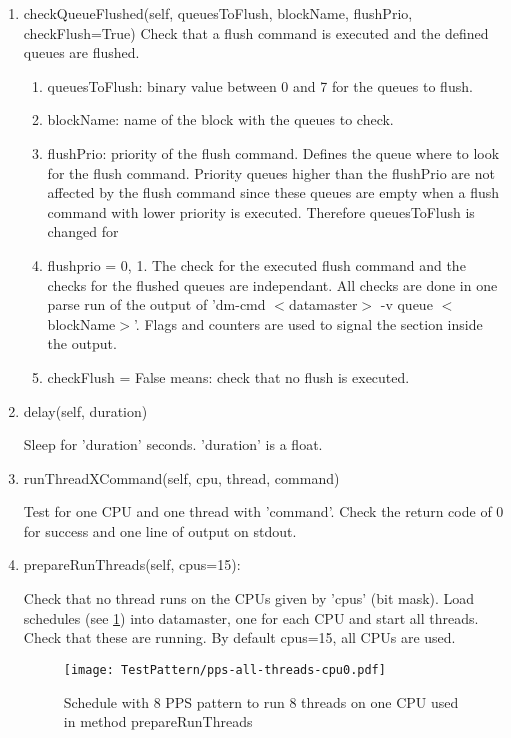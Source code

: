 \documentclass[12pt,a4paper]{report}
\begin{document}
\begin{enumerate}
\item checkQueueFlushed(self, queuesToFlush, blockName, flushPrio, checkFlush=True)
Check that a flush command is executed and the defined queues are flushed.
\begin{enumerate}
\item queuesToFlush: binary value between 0 and 7 for the queues to flush.
\item blockName: name of the block with the queues to check.
\item flushPrio: priority of the flush command. Defines the queue where to look for the flush command.
Priority queues higher than the flushPrio are not affected by the flush command since these
queues are empty when a flush command with lower priority is executed. Therefore queuesToFlush is changed for
\item flushprio = 0, 1.
The check for the executed flush command and the checks for the flushed queues are independant. All checks
are done in one parse run of the output of 'dm-cmd $<$datamaster$>$ -v queue $<$blockName$>$'. Flags and counters
are used to signal the section inside the output.
\item checkFlush = False means: check that no flush is executed.
\end{enumerate}

\item delay(self, duration)

Sleep for 'duration' seconds. 'duration' is a float.

\item runThreadXCommand(self, cpu, thread, command)

Test for one CPU and one thread with 'command'.
Check the return code of 0 for success and one line of output on stdout.

\item prepareRunThreads(self, cpus=15):

Check that no thread runs on the CPUs given by 'cpus' (bit mask).
Load schedules (see \ref{fig:pps-cpu0}) into datamaster, one for each CPU and start all threads.
Check that these are running. By default cpus=15, all CPUs are used.
    \begin{figure}
        \centering
        \texttt{[image: TestPattern/pps-all-threads-cpu0.pdf]}
        \caption{Schedule with 8 PPS pattern to run 8 threads on one CPU used in method prepareRunThreads}
        \label{fig:pps-cpu0}
    \end{figure}


\end{enumerate}
\end{document}
